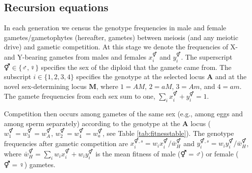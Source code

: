 \documentclass[12pt]{article}
\begin{document}
\subsection*{Recursion equations}
\label{app:recurs}


In each generation we census the genotype frequencies in male and female gametes/gametophytes (hereafter, gametes) between meiosis (and any meiotic drive) and gametic competition. 
At this stage we denote the frequencies of X- and Y-bearing gametes from males and females $x_{i}^{\Hermaphrodite}$ and $y_{i}^{\Hermaphrodite}$.
The superscript $\Hermaphrodite \in \{\male,\female\}$ specifies the sex of the diploid that the gamete came from. 
The subscript $i\in\{1,2,3,4\}$ specifies the genotype at the selected locus $\mathbf{A}$ and at the novel sex-determining locus $\mathbf{M}$, where $1=AM$, $2=aM$, $3=Am$, and $4=am$. 
The gamete frequencies from each sex sum to one, $\sum_{i}x_{i}^{\Hermaphrodite}+y_{i}^{\Hermaphrodite}=1$. 

Competition then occurs among gametes of the same sex (e.g., among eggs and among sperm separately) according to the genotype at the \textbf{A} locus ($w_{1}^\Hermaphrodite=w_{3}^\Hermaphrodite=w_{A}^\Hermaphrodite$, $w_{2}^\Hermaphrodite=w_{4}^\Hermaphrodite=w_{a}^\Hermaphrodite$, see Table \ref{tab:fitnesstable}).
The genotype frequencies after gametic competition are $x_{i}^{\Hermaphrodite,s}= w_{i}x_{i}^{\Hermaphrodite}/\bar{w}_{H}^{\Hermaphrodite}$ and $y_{i}^{\Hermaphrodite,s}= w_{i}y_{i}^{\Hermaphrodite}/\bar{w}_{H}^{\Hermaphrodite}$, where $\bar{w}_{H}^{\Hermaphrodite}=\sum_{i} w_{i}x_{i}^{\Hermaphrodite}+w_{i}y_{i}^{\Hermaphrodite}$ is the mean fitness of male ($\Hermaphrodite=\male$) or female ($\Hermaphrodite=\female$) gametes. 
\end{document}
